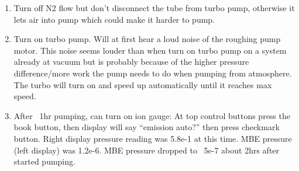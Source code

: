 \begin{enumerate}
\begin{enumerate}
\item	Turn off N2 flow but don’t disconnect the tube from turbo pump, otherwise it lets air into pump which could make it harder to pump. 
\item	Turn on turbo pump. Will at first hear a loud noise of the roughing pump motor. This noise seems louder than when turn on turbo pump on a system already at vacuum but is probably because of the higher pressure difference/more work the pump needs to do when pumping from atmosphere. The turbo will turn on and speed up automatically until it reaches max speed. 
\item	After ~1hr pumping, can turn on ion gauge: At top control buttons press the book button, then display will say “emission auto?” then press checkmark button. Right display pressure reading was 5.8e-1 at this time. MBE pressure (left display) was 1.2e-6. MBE pressure dropped to ~5e-7 about 2hrs after started pumping.
\end{enumerate}
\end{enumerate}


